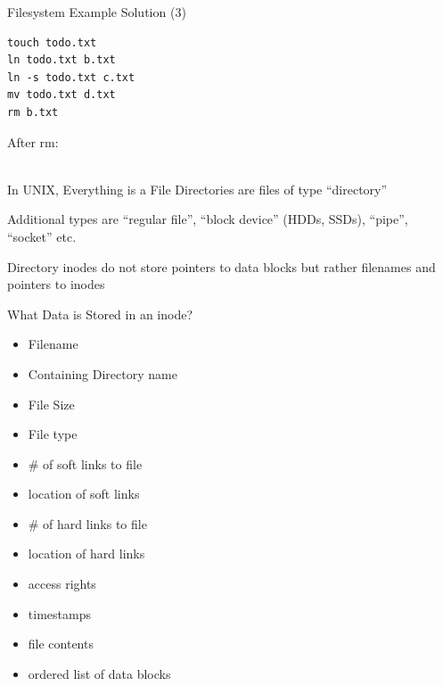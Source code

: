   \begin{frame}[fragile]{Filesystem Example Solution (3)}
    \begin{lstlisting}
touch todo.txt
ln todo.txt b.txt
ln -s todo.txt c.txt
mv todo.txt d.txt
rm b.txt
    \end{lstlisting}

    After rm:\\\,\\

  \end{frame}

  \begin{frame}{In UNIX, Everything is a File}
    Directories are files of type ``directory''

    \vspace{2em}

    Additional types are ``regular file'', ``block device'' (HDDs, SSDs), ``pipe'', ``socket'' etc.

    \vspace{2em}

    Directory inodes do not store pointers to data blocks but rather filenames and pointers to inodes
  \end{frame}

  \begin{frame}{What Data is Stored in an inode?}
     \small
      \begin{itemize}
        \item[a] Filename
        \item[b] Containing Directory name
        \item[c] File Size 
        \item[d] File type
        \item[e] \# of soft links to file
        \item[f] location of soft links 
        \item[g] \# of hard links to file  
        \item[h] location of hard links
        \item[i] access rights
        \item[j] timestamps
        \item[k] file contents
        \item[l] ordered list of data blocks     
      \end{itemize}
  \end{frame}

